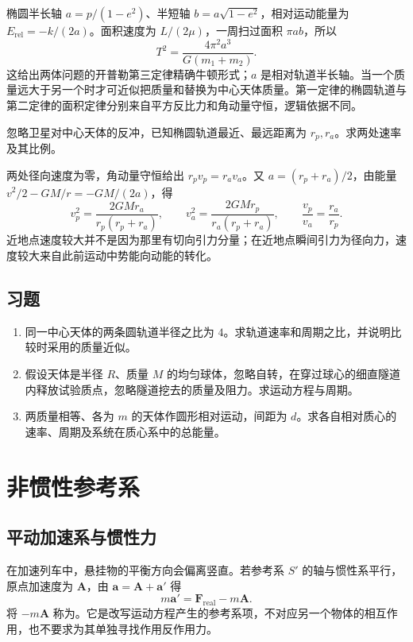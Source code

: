 \documentclass[UTF8,12pt,a4paper,fontset=fandol]{ctexbook}
\begin{document}
椭圆半长轴 $a=p/(1-e^2)$、半短轴 $b=a\sqrt{1-e^2}$，相对运动能量为 $E_{\mathrm{rel}}=-k/(2a)$。面积速度为 $L/(2\mu)$，一周扫过面积 $\pi ab$，所以
\begin{equation}
 T^2=\frac{4\pi^2a^3}{G(m_1+m_2)}.
 \label{eq:mech-kepler-third}
\end{equation}
这给出两体问题的开普勒第三定律精确牛顿形式；$a$ 是相对轨道半长轴。当一个质量远大于另一个时才可近似把质量和替换为中心天体质量。第一定律的椭圆轨道与第二定律的面积定律分别来自平方反比力和角动量守恒，逻辑依据不同。

\begin{example}[近地点和远地点的速度比]
忽略卫星对中心天体的反冲，已知椭圆轨道最近、最远距离为 $r_p,r_a$。求两处速率及其比例。
\end{example}
\begin{solve}
两处径向速度为零，角动量守恒给出 $r_pv_p=r_av_a$。又 $a=(r_p+r_a)/2$，由能量 $v^2/2-GM/r=-GM/(2a)$，得
\[
 v_p^2=\frac{2GMr_a}{r_p(r_p+r_a)},\qquad
 v_a^2=\frac{2GMr_p}{r_a(r_p+r_a)},\qquad \frac{v_p}{v_a}=\frac{r_a}{r_p}.
\]
近地点速度较大并不是因为那里有切向引力分量；在近地点瞬间引力为径向力，速度较大来自此前运动中势能向动能的转化。
\end{solve}

\section{习题}
\begin{enumerate}[label=\thechapter.\arabic*,ref=\thechapter.\arabic*]
\item\label{exr:mech-satellite} 同一中心天体的两条圆轨道半径之比为 $4$。求轨道速率和周期之比，并说明比较时采用的质量近似。
\item\label{exr:mech-uniform-earth} 假设天体是半径 $R$、质量 $M$ 的均匀球体，忽略自转，在穿过球心的细直隧道内释放试验质点，忽略隧道挖去的质量及阻力。求运动方程与周期。
\item\label{exr:mech-orbit-energy} 两质量相等、各为 $m$ 的天体作圆形相对运动，间距为 $d$。求各自相对质心的速率、周期及系统在质心系中的总能量。
\end{enumerate}

\chapter{非惯性参考系}
\label{chap:mech-frames}

\section{平动加速系与惯性力}
在加速列车中，悬挂物的平衡方向会偏离竖直。若参考系 $S'$ 的轴与惯性系平行，原点加速度为 $\mathbf A$，由 $\mathbf a=\mathbf A+\mathbf a'$ 得
\[
 m\mathbf a'=\mathbf F_{\mathrm{real}}-m\mathbf A.
\]
将 $-m\mathbf A$ 称为。它是改写运动方程产生的参考系项，不对应另一个物体的相互作用，也不要求为其单独寻找作用反作用力。
\end{document}
